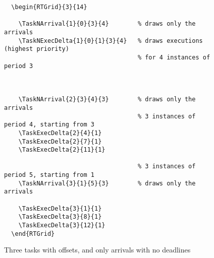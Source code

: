 \documentclass{article}
\begin{document}
\begin{figure}[!htbp]
  \centering
  \begin{RTGrid}{3}{14}
                                      
                               
 
                                   


  \end{RTGrid}

\begin{verbatim}
  \begin{RTGrid}{3}{14}
                                      
    \TaskNArrival{1}{0}{3}{4}        % draws only the arrivals 
    \TaskNExecDelta{1}{0}{1}{3}{4}   % draws executions (highest priority)
                                     % for 4 instances of period 3 
                               
 
                                   
    \TaskNArrival{2}{3}{4}{3}        % draws only the arrivals
                                     % 3 instances of period 4, starting from 3 
    \TaskExecDelta{2}{4}{1}
    \TaskExecDelta{2}{7}{1}
    \TaskExecDelta{2}{11}{1}

                                     % 3 instances of period 5, starting from 1 
    \TaskNArrival{3}{1}{5}{3}        % draws only the arrivals

    \TaskExecDelta{3}{1}{1}
    \TaskExecDelta{3}{8}{1}
    \TaskExecDelta{3}{12}{1}
  \end{RTGrid}
\end{verbatim}
  \caption{Three tasks with offsets, and only arrivals with no deadlines}
  \label{fig:ex1b}
\end{figure}
\end{document}
